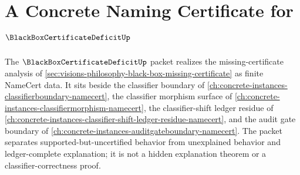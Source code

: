 \chapter{A Concrete Naming Certificate for $\BlackBoxCertificateDeficitUp$}
\label{ch:concrete-instances-black-box-certificate-deficit-namecert}

The $\BlackBoxCertificateDeficitUp$ packet realizes the missing-certificate analysis of \autoref{sec:visions-philosophy-black-box-missing-certificate} as finite NameCert data. It sits beside the classifier boundary of \autoref{ch:concrete-instances-classifierboundary-namecert}, the classifier morphism surface of \autoref{ch:concrete-instances-classifiermorphism-namecert}, the classifier-shift ledger residue of \autoref{ch:concrete-instances-classifier-shift-ledger-residue-namecert}, and the audit gate boundary of \autoref{ch:concrete-instances-auditgateboundary-namecert}. The packet separates supported-but-uncertified behavior from unexplained behavior and ledger-complete explanation; it is not a hidden explanation theorem or a classifier-correctness proof.

